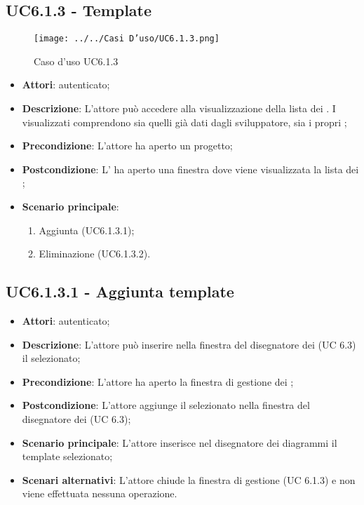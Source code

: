\subsection{UC6.1.3 - Template}
\label{ssec:UC6.1.3}
\begin{figure}[h!]
\centering
\texttt{[image: ../../Casi D'uso/UC6.1.3.png]}
\caption{Caso d'uso UC6.1.3}
 \end{figure}
\begin{itemize}
\item \textbf{Attori}:  autenticato;
\item \textbf{Descrizione}: L’attore può accedere alla visualizzazione della lista dei . I  visualizzati comprendono sia quelli già dati dagli sviluppatore, sia i propri ;
\item \textbf{Precondizione}: L’attore ha aperto un progetto;
\item \textbf{Postcondizione}: L' ha aperto una finestra dove viene visualizzata la lista dei ;
\item \textbf{Scenario principale}: \begin{enumerate}\item Aggiunta  (UC6.1.3.1);\item Eliminazione  (UC6.1.3.2).
 \end{enumerate}
\end{itemize}
\subsection{UC6.1.3.1 - Aggiunta template}
\label{ssec:UC6.1.3.1}
\begin{itemize}
\item \textbf{Attori}:  autenticato;
\item \textbf{Descrizione}: L'attore può inserire nella finestra del disegnatore dei  (UC 6.3) il  selezionato;
\item \textbf{Precondizione}: L'attore ha aperto la finestra di gestione dei ;
\item \textbf{Postcondizione}: L'attore aggiunge il  selezionato nella finestra del disegnatore dei (UC 6.3);
\item \textbf{Scenario principale}: L'attore inserisce nel disegnatore dei diagrammi il template selezionato;
\item \textbf{Scenari alternativi}: L'attore chiude la finestra di gestione  (UC 6.1.3) e non viene effettuata nessuna operazione.
\end{itemize}
